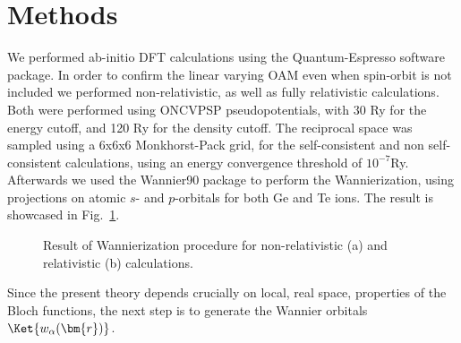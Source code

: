 
\section{Methods}
We performed ab-initio DFT calculations using the Quantum-Espresso software package\cite{Giannozzi2009}. In order to confirm the linear varying OAM even when spin-orbit is not included we performed non-relativistic, as well as fully relativistic calculations.
Both were performed using ONCVPSP pseudopotentials, with 30 Ry for the energy cutoff, and 120 Ry for the density cutoff.
The reciprocal space was sampled using a 6x6x6 Monkhorst-Pack grid, for the self-consistent and non self-consistent calculations, using an energy convergence threshold of $10^{-7}$Ry.
Afterwards we used the Wannier90 package \cite{Mostofi2014AnFunctions} to perform the Wannierization, using projections on atomic $s$- and $p$-orbitals for both Ge and Te ions. The result is showcased in Fig.~\ref{fig:GeTe_wannierization}.
\begin{figure}[b!]
\caption{\label{fig:GeTe_wannierization} Result of Wannierization procedure for non-relativistic (a) and relativistic (b) calculations.}
\end{figure}

Since the present theory depends crucially on local, real space, properties of the Bloch functions, the next step is to generate the Wannier orbitals $\Ket{w_\alpha(\bm{r})}$.



